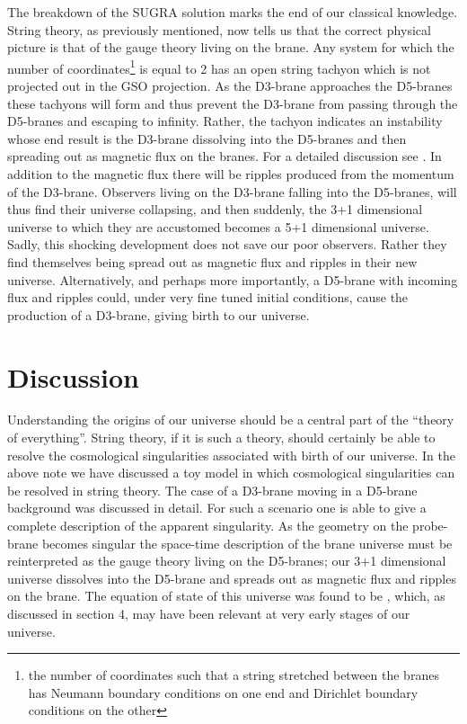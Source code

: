 \documentclass[a4paper,12pt]{article}
\providecommand{\ed}{\varepsilon}
\begin{document}
The breakdown of the SUGRA solution marks the end of our classical
knowledge.  String theory, as previously mentioned, now tells us that 
the correct physical picture
is that of the gauge theory living on the brane.  Any system for which
the number of \coordHE{} coordinates\footnote{the number of coordinates such that a
string stretched between the branes has Neumann boundary conditions on
one end and Dirichlet boundary conditions on the other} is equal to 2 has
an open string tachyon which is not projected out in the GSO
projection.  As the
D3-brane approaches the D5-branes these tachyons will form and thus
prevent the D3-brane from passing through the D5-branes and escaping
to infinity.  Rather, the tachyon indicates an instability whose
end result is the D3-brane dissolving into the D5-branes and then spreading
out as magnetic flux on the
branes.  For a detailed discussion see \cite{cnds}.  In
addition to the magnetic flux there
will be ripples produced from the momentum of the D3-brane.
Observers living on the D3-brane falling into the D5-branes,
will thus find their universe collapsing, and then suddenly, the 3+1
dimensional universe to which they are accustomed becomes a 5+1
dimensional universe.  Sadly, this shocking development does not save our
poor observers.  Rather they find themselves being spread out as
magnetic flux and
ripples in their new universe.  Alternatively, and perhaps
more importantly, a D5-brane
with incoming flux and ripples could, under very fine tuned initial
conditions, cause the production of a D3-brane, giving birth to
our universe.
%
%
\section{Discussion}
%
%

Understanding the origins of our universe should be a central part of the
``theory of everything''.  String theory, 
if it is such a theory, should certainly be able to resolve the cosmological
singularities associated with birth of our universe. 
In the above note we have discussed a toy model in which cosmological
singularities can be resolved in string theory.  The case of a
D3-brane moving in a
D5-brane background was discussed in detail.  For such a scenario one
is able to give a complete description of the apparent singularity.  As the
geometry on the probe-brane becomes
singular the space-time description of the brane universe must be
reinterpreted as the gauge theory
living on the D5-branes;  our 3+1 dimensional universe dissolves into the
D5-brane and spreads out as magnetic flux and ripples on the brane.  
The equation of state of this universe was found to be \myHighlight{$p = \ed$}\coordHE{}, 
which, as discussed in
section 4, may have been relevant at very early stages of our universe.  
\end{document}
